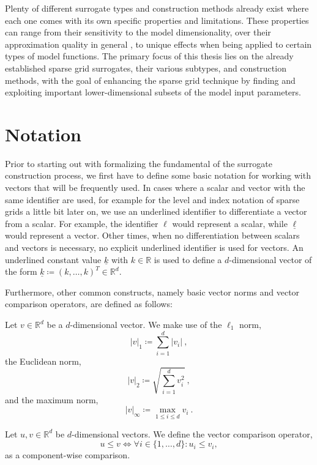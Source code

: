 \documentclass[
  a4paper,  %
  twoside,  %
  bibliography=totoc,
  headsepline,
  cleardoublepage=empty,
  parskip=half,
  draft=false
]{scrbook}
\begin{document}
Plenty of different surrogate types and construction methods already exist where each one comes with its own specific properties and limitations.
These properties can range from their sensitivity to the model dimensionality, over their approximation quality in general , to unique effects when being applied to certain types of model functions.
The primary focus of this thesis lies on the already established sparse grid surrogates, their various subtypes, and construction methods, with the goal of enhancing the sparse grid technique by finding and exploiting important lower-dimensional subsets of the model input parameters.

\newpage
\section{Notation}

Prior to starting out with formalizing the fundamental of the surrogate construction process, we first have to define some basic notation for working with vectors that will be frequently used.
In cases where a scalar and vector with the same identifier are used, for example for the level and index notation of sparse grids a little bit later on, we use an underlined identifier to differentiate a vector from a scalar.
For example, the identifier $\ell$ would represent a scalar, while $\underline{\ell}$ would represent a vector.
Other times, when no differentiation between scalars and vectors is necessary, no explicit underlined identifier is used for vectors.
An underlined constant value $\underline{k}$ with $k \in\mathds{R}$ is used to define a $d$-dimensional vector of the form $\underline{k} \coloneqq (k, \dots, k)^T \in \mathds{R}^d$.

Furthermore, other common constructs, namely basic vector norms and vector comparison operators, are defined as follows:
\begin{definition}
Let $v \in \mathds{R}^d$ be a $d$-dimensional vector.
We make use of the $\ell_1$ norm,
\begin{equation}
|v|_1 \coloneqq \sum_{i=1}^d |v_i| ~,
\end{equation}
the Euclidean norm,
\begin{equation}
|v|_2 \coloneqq \sqrt{\sum_{i=1}^d v_i^2} ~,
\end{equation}
and the maximum norm,
\begin{equation}
|v|_\infty \coloneqq \max_{1 \leq i \leq d} v_i ~.
\end{equation}
\end{definition}
%
\begin{definition}
Let $u, v \in \mathds{R}^d$ be $d$-dimensional vectors.
We define the vector comparison operator,
\begin{equation}
u \leq v \Leftrightarrow \forall i \in \{1,\dots,d\} \colon u_i \leq v_i,
\end{equation}
as a component-wise comparison.
\end{definition}
\end{document}
